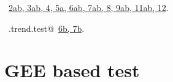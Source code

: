 \documentclass[reqno]{amsart}
\renewcommand{\NWlink}[2]{\hyperlink{#1}{#2}}
\begin{document}
\begin{flushleft}
\vspace{-1.5ex}
\footnotesize
\begin{list}{}{\setlength{\itemsep}{-\parsep}\setlength{\itemindent}{-\leftmargin}}
\item \NWtxtFileDefBy\ \NWlink{nuweb2a}{2a}\NWlink{nuweb2b}{b}\NWlink{nuweb3a}{, 3a}\NWlink{nuweb3b}{b}\NWlink{nuweb4}{, 4}\NWlink{nuweb5a}{, 5a}\NWlink{nuweb6a}{, 6a}\NWlink{nuweb6b}{b}\NWlink{nuweb7a}{, 7a}\NWlink{nuweb7b}{b}\NWlink{nuweb8}{, 8}\NWlink{nuweb9a}{, 9a}\NWlink{nuweb9b}{b}\NWlink{nuweb11a}{, 11a}\NWlink{nuweb11b}{b}\NWlink{nuweb12}{, 12}.
\item \NWtxtIdentsDefed\nobreak\  \verb@RS.trend.test@\nobreak\ \NWlink{nuweb6b}{6b}\NWlink{nuweb7b}{, 7b}.
\item{}
\end{list}
\vspace{4ex}
\end{flushleft}
\section{GEE based test}
\end{document}
